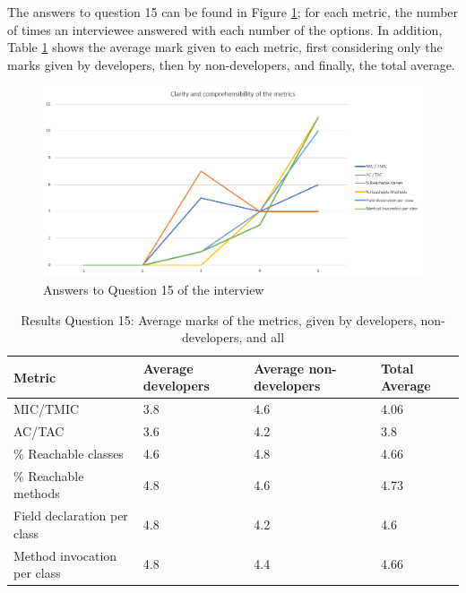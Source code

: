 The answers to question 15 can be found in Figure \ref{fig:interview-15}; for each metric, the number of times an interviewee answered with each number of the options. In addition, Table \ref{table:interview-15} shows the average mark given to each metric, first considering only the marks given by developers, then by non-developers, and finally, the total average.

\begin{figure}[ht!]
\begin{center}
\includegraphics[width=\textwidth]{figures/interview/Question15.png}
\caption{Answers to Question 15 of the interview}
\label{fig:interview-15}
\end{center}
\end{figure}

\begin{table}[ht!]
    \begin{center}
    \begin{tabular}{|l|l|l|l|}
    \hline
    Metric                      & Average developers  & Average non-developers  & Total Average \\
    \hline
    MIC/TMIC                    & 3.8                 & 4.6               & 4.06 \\
    AC/TAC                      & 3.6                 & 4.2               & 3.8 \\
    \% Reachable classes        & 4.6                 & 4.8               & 4.66 \\
    \% Reachable methods        & 4.8                 & 4.6               & 4.73 \\
    Field declaration per class & 4.8                 & 4.2               & 4.6 \\
    Method invocation per class & 4.8                 & 4.4               & 4.66 \\
    \hline
    \end{tabular}
    \end{center}
    \caption{Results Question 15: Average marks of the metrics, given by developers, non-developers, and all}
    \label{table:interview-15}
\end{table}

